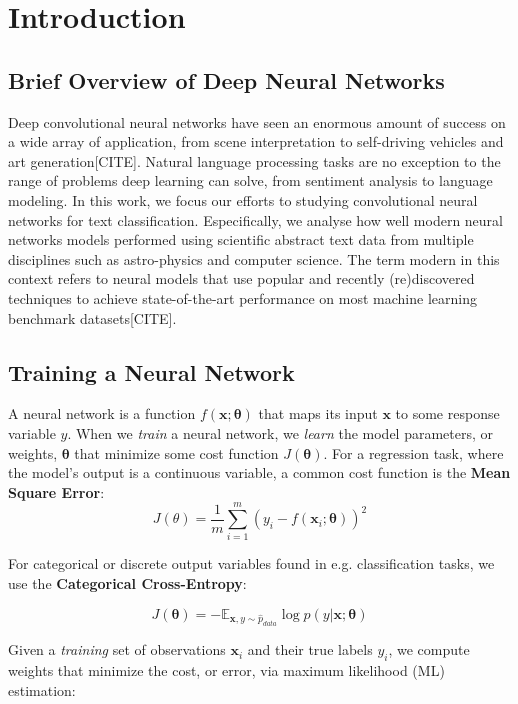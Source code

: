 
\chapter{Introduction}

\section{Brief Overview of Deep Neural Networks}
Deep convolutional neural networks have seen an enormous amount of success on a wide
array of application, from scene interpretation to self-driving vehicles and art generation[CITE].
Natural language processing tasks are no exception to the range of problems
deep learning can solve, from sentiment analysis to language modeling. In this work, we
focus our efforts to studying convolutional neural networks for text classification. Especifically,
we analyse how well modern neural networks models performed using scientific
abstract text data from multiple disciplines such as astro-physics and computer science.
The term modern in this context refers to neural models that use popular and recently
(re)discovered techniques to achieve state-of-the-art performance on most machine learning
benchmark datasets[CITE].

\section{Training a Neural Network}

A neural network is a function $f(\bm{x};\bm{\theta})$ that maps its input $\bm{x}$ to some response variable $y$. When we \textit{train} a
neural network, we \textit{learn} the model parameters, or weights, $\bm{\theta}$ that minimize some cost function $J(\bm{\theta})$.
For a regression task, where the model's output is a continuous variable, a common cost function is the \textbf{Mean Square Error}:
\[J(\theta) = \frac{1}{m}\sum_{i=1}^{m}(y_{i} - f(\bm{x}_{i};\bm{\theta}))^{2}\]

For categorical or discrete output variables found in e.g. classification tasks, we use the \textbf{Categorical Cross-Entropy}:

\[J(\bm{\theta}) = -\mathbb{E}_{\bm{x},y \sim \hat p_{data}} \log \textit{p}(y|\bm{x};\bm{\theta})\]

Given a \textit{training} set of observations $\bm{x}_i$ and their true labels $y_i$, we compute weights that minimize the cost, or error, via
maximum likelihood (ML) estimation:

